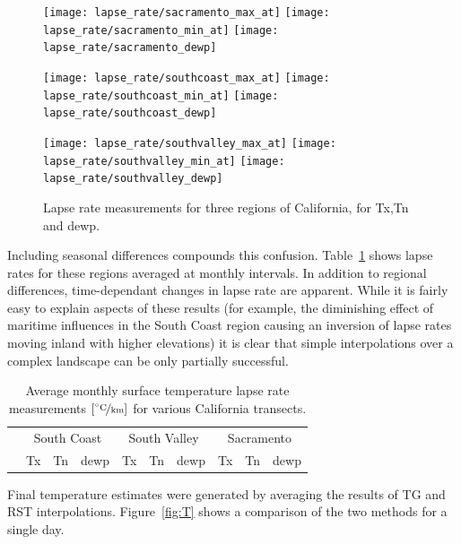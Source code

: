 \documentclass[reviewcopy]{elsart}
\begin{document}
\begin{figure}
  \centering
  \texttt{[image: lapse\_rate/sacramento\_max\_at]}
  \texttt{[image: lapse\_rate/sacramento\_min\_at]} 
  \texttt{[image: lapse\_rate/sacramento\_dewp]}

  \texttt{[image: lapse\_rate/southcoast\_max\_at]}
  \texttt{[image: lapse\_rate/southcoast\_min\_at]} 
  \texttt{[image: lapse\_rate/southcoast\_dewp]}

  \texttt{[image: lapse\_rate/southvalley\_max\_at]}
  \texttt{[image: lapse\_rate/southvalley\_min\_at]} 
  \texttt{[image: lapse\_rate/southvalley\_dewp]}
  \caption{Lapse rate measurements for three regions of California, for
\ac{Tx},\ac{Tn} and \ac{dewp}.
}
\label{fig:lapse-rate}
\end{figure}

Including seasonal differences compounds this confusion.
Table~\ref{tab:lapse_rate} shows lapse rates for these regions
averaged at monthly intervals.  In addition to regional differences,
time-dependant changes in lapse rate are apparent.  While it is fairly
easy to explain aspects of these results (for example, the diminishing
effect of maritime influences in the South Coast region causing an
inversion of lapse rates moving inland with higher elevations) it is
clear that simple interpolations over a complex landscape can be only
partially successful.

\begin{table}
  \centering
  \caption{Average monthly surface temperature lapse rate measurements $[\unitfrac{\ensuremath{^\circ}C}{km}]$ for various California transects.
  }
\begin{tabular}{c | c c c | c c c | c c c }
& \multicolumn{3}{c|}{South Coast} & \multicolumn{3}{c|}{South Valley} & \multicolumn{3}{c}{Sacramento} \\
\raisebox{1.5ex}{Month} & \ac{Tx} & \ac{Tn} & \ac{dewp} & \ac{Tx} & \ac{Tn}  &\ac{dewp} & \ac{Tx} & \ac{Tn} & \ac{dewp} \\ \hline \hline

\end{tabular}
\label{tab:lapse_rate}
\end{table}

Final temperature estimates were generated by averaging the
results of \ac{TG} and \ac{RST} interpolations.  Figure~\ref{fig:T}
shows a comparison of the two methods for a single day.
\end{document}
